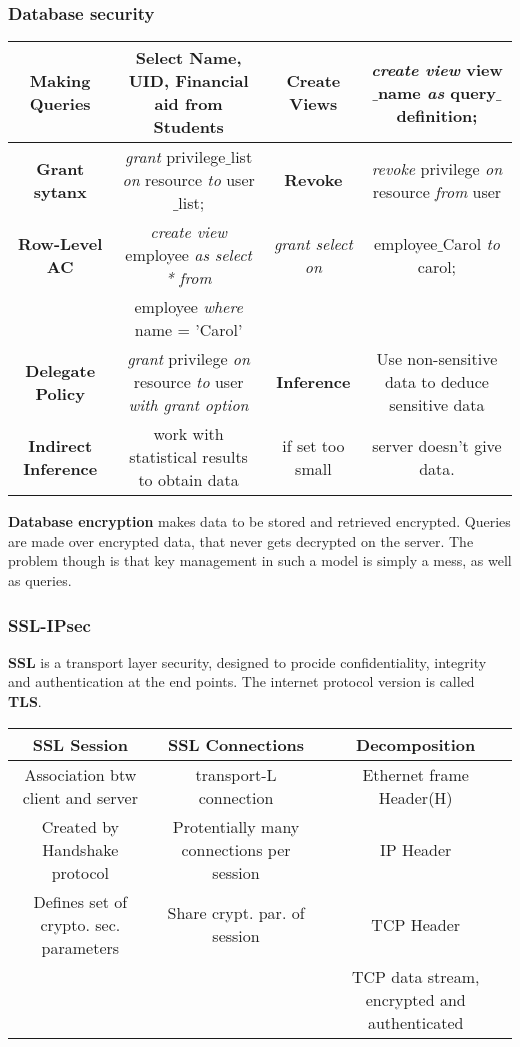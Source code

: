 \documentclass[a4paper,1pt]{article}
\begin{document}
\subsubsection{Database security} %
\label{sub:Database security}
\begin{tabular}{| c | c | c | c |}
  \hline
  {\bf Making Queries} & Select Name, UID, Financial aid from Students & {\bf Create Views} & \emph{create view} view$\_$name \emph{as} query$\_$definition; \\
  \hline
  {\bf Grant sytanx} & \emph{grant} privilege$\_$list \emph{on} resource \emph{to} user$\_$list; & {\bf Revoke} & \emph{revoke} privilege \emph{on} resource \emph{from} user \\
  \hline
  {\bf Row-Level AC} & \emph{create view} employee \emph{as select * from} & \emph{grant select on} & employee$\_$Carol \emph{to} carol;\\
  & employee \emph{where} name = 'Carol'&   \\
  \hline
  {\bf Delegate Policy} & \emph{grant} privilege \emph{on} resource \emph{to} user \emph{with grant option} & {\bf Inference} & Use non-sensitive data to deduce sensitive data\\
  \hline
  {\bf Indirect Inference} & work with statistical results to obtain data & if set too small & server doesn't give data.\\
  \hline
\end{tabular}
{\bf Database encryption} makes data to be stored and retrieved encrypted. Queries are made over encrypted data, that never gets decrypted on the server. The problem though is that key management in such a model is simply a mess, as well as queries.
\subsubsection{SSL-IPsec} %
\label{sub:SSL-IPsec}
{\bf SSL} is a transport layer security, designed to procide confidentiality, integrity and authentication at the end points. The internet protocol version is called {\bf TLS}. \\
\begin{tabular}{| c | c | c |}
  \hline
  {\bf SSL Session } & {\bf SSL Connections} & {\bf Decomposition} \\
  \hline
  Association btw client and server & transport-L connection & Ethernet frame Header(H) \\
  \hline
  Created by Handshake protocol & Protentially many connections per session & IP Header \\
  \hline
  Defines set of crypto. sec. parameters & Share crypt. par. of session & TCP Header \\
   & & TCP data stream, encrypted and authenticated \\
  \hline
\end{tabular}
\end{document}
